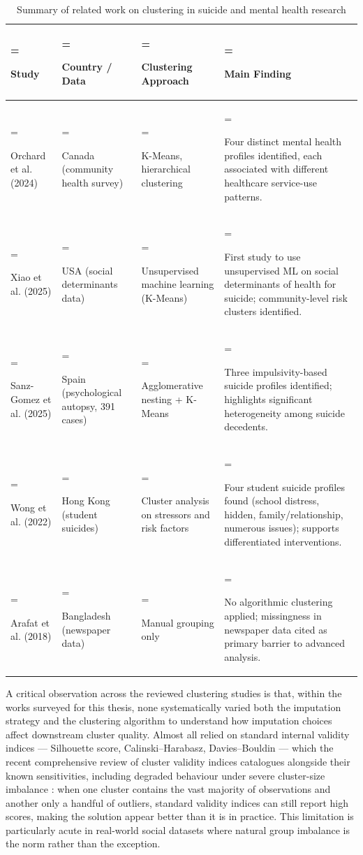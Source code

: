 \begin{table}[H]
\centering
\caption[Related work on clustering in suicide and mental health]{Summary of related work on clustering in suicide and mental health research}
\label{tbl:summary_of_related_work_on_clu}
\renewcommand{\arraystretch}{1.0}
\small
\begin{tabularx}{\textwidth}{|>{\hsize=0.691\hsize\linewidth=\hsize\raggedright\arraybackslash}X|>{\hsize=0.841\hsize\linewidth=\hsize\raggedright\arraybackslash}X|>{\hsize=0.892\hsize\linewidth=\hsize\raggedright\arraybackslash}X|>{\hsize=1.576\hsize\linewidth=\hsize\raggedright\arraybackslash}X|}
\hline
\textbf{Study} & \textbf{Country / Data} & \textbf{Clustering Approach} & \textbf{Main Finding} \\ \hline
Orchard et al. (2024) \cite{ref34} & Canada (community health survey) & K-Means, hierarchical clustering & Four distinct mental health profiles identified, each associated with different healthcare service-use patterns. \\ \hline
Xiao et al. (2025) \cite{ref35} & USA (social determinants data) & Unsupervised machine learning (K-Means) & First study to use unsupervised ML on social determinants of health for suicide; community-level risk clusters identified. \\ \hline
Sanz-Gomez et al. (2025) \cite{ref36} & Spain (psychological autopsy, 391 cases) & Agglomerative nesting + K-Means & Three impulsivity-based suicide profiles identified; highlights significant heterogeneity among suicide decedents. \\ \hline
Wong et al. (2022) \cite{ref37} & Hong Kong (student suicides) & Cluster analysis on stressors and risk factors & Four student suicide profiles found (school distress, hidden, family/relationship, numerous issues); supports differentiated interventions. \\ \hline
Arafat et al. (2018) \cite{ref4} & Bangladesh (newspaper data) & Manual grouping only & No algorithmic clustering applied; missingness in newspaper data cited as primary barrier to advanced analysis. \\ \hline
\end{tabularx}
\end{table}

A critical observation across the reviewed clustering studies is that, within the works surveyed for this thesis, none systematically varied both the imputation strategy and the clustering algorithm to understand how imputation choices affect downstream cluster quality. Almost all relied on standard internal validity indices --- Silhouette score, Calinski--Harabasz, Davies--Bouldin --- which the recent comprehensive review of cluster validity indices catalogues alongside their known sensitivities, including degraded behaviour under severe cluster-size imbalance \cite{ref54}: when one cluster contains the vast majority of observations and another only a handful of outliers, standard validity indices can still report high scores, making the solution appear better than it is in practice. This limitation is particularly acute in real-world social datasets where natural group imbalance is the norm rather than the exception.

